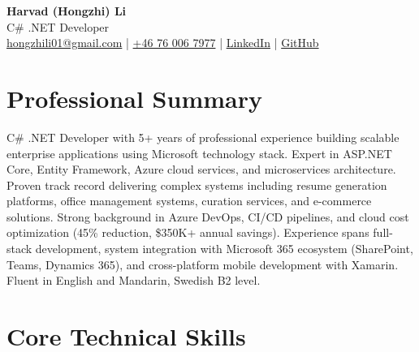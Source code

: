 \documentclass[11pt,a4paper]{article}
\begin{document}
\pagestyle{empty}

\begin{center}
{\LARGE \textbf{Harvad (Hongzhi) Li}}\\[10pt]
{\Large C\# .NET Developer}\\[10pt]
\textcolor{linkedinblue}{\href{mailto:hongzhili01@gmail.com}{hongzhili01@gmail.com} | \href{tel:+46760067977}{+46 76 006 7977} | \href{https://www.linkedin.com/in/harvad/}{LinkedIn} | \href{https://github.com/bluehawana}{GitHub}}
\end{center}

\section*{Professional Summary}

C\# .NET Developer with 5+ years of professional experience building scalable enterprise applications using Microsoft technology stack. Expert in ASP.NET Core, Entity Framework, Azure cloud services, and microservices architecture. Proven track record delivering complex systems including resume generation platforms, office management systems, curation services, and e-commerce solutions. Strong background in Azure DevOps, CI/CD pipelines, and cloud cost optimization (45\% reduction, \$350K+ annual savings). Experience spans full-stack development, system integration with Microsoft 365 ecosystem (SharePoint, Teams, Dynamics 365), and cross-platform mobile development with Xamarin. Fluent in English and Mandarin, Swedish B2 level.

\section*{Core Technical Skills}
\end{document}
